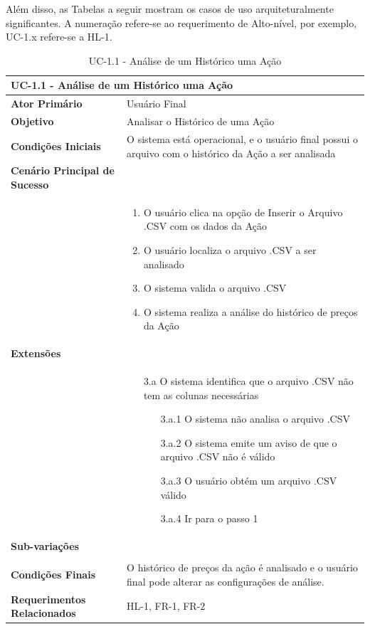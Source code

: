 \documentclass[12pt]{article}
\begin{document}
Além disso, as Tabelas a seguir mostram os casos de uso arquiteturalmente significantes.
A numeração refere-se ao requerimento de Alto-nível, por exemplo, UC-1.x refere-se a HL-1.

\begingroup
\renewcommand*{\arraystretch}{1.2}
\begin{table}[H]
	\caption{UC-1.1 - Análise de um Histórico uma Ação}
	\begin{tabular}{p{6cm} p{8cm}}
		\multicolumn{2}{l}{\large{\textbf{UC-1.1 - Análise de um Histórico uma Ação}}}\\
		\toprule
		\textbf{Ator Primário}		&	Usuário Final \\
		\midrule
		\textbf{Objetivo}			&	Analisar o Histórico de uma Ação \\
		\midrule
		\textbf{Condições Iniciais}	&	O sistema está operacional, e o usuário final possui
										o arquivo com o histórico da Ação a ser analisada \\
		\midrule
		\textbf{Cenário Principal de Sucesso}	& \\
		& \begin{enumerate}
			\item O usuário clica na opção de Inserir o Arquivo .CSV com os dados da Ação
			\item O usuário localiza o arquivo .CSV a ser analisado
			\item O sistema valida o arquivo .CSV
			\item O sistema realiza a análise do histórico de preços da Ação
		\end{enumerate}\\
		\midrule
		\textbf{Extensões}	& \\
		& \begin{enumerate}
			\item[3.a] O sistema identifica que o arquivo .CSV não tem as colunas necessárias
			\begin{enumerate}
				\item[3.a.1] O sistema não analisa o arquivo .CSV
				\item[3.a.2] O sistema emite um aviso de que o arquivo .CSV não é válido
				\item[3.a.3] O usuário obtém um arquivo .CSV válido
				\item[3.a.4] Ir para o passo 1 
			\end{enumerate}
		\end{enumerate}\\
		\midrule
		\textbf{Sub-variações} & \\
		& \\
		\midrule
		\textbf{Condições Finais} & O histórico de preços da ação é analisado e o usuário final
									pode alterar as configurações de análise. \\
		\midrule
		\textbf{Requerimentos Relacionados} & HL-1, FR-1, FR-2 \\
		\bottomrule
	\end{tabular}		
\end{table}
\end{document}
